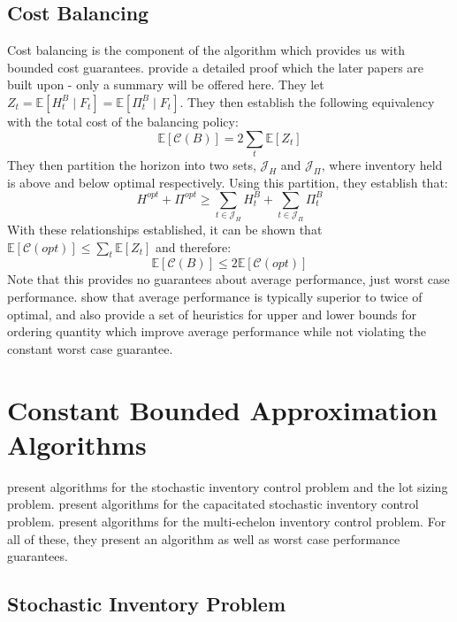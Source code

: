 \documentclass[12pt]{article}
\newcommand{\EX}{\mathbb{E}}
\begin{document}
\subsection{Cost Balancing}

Cost balancing is the component of the algorithm which provides us with bounded cost guarantees. \cite{levi:2007} provide a detailed proof which the later papers are built upon - only a summary will be offered here. They let $Z_t = \EX[H_t^B \; | \; F_t] = \EX[\Pi_t^B \; | \; F_t]$. They then establish the following equivalency with the total cost of the balancing policy:
$$
	\EX[\mathcal{C}(B)] = 2 \sum_t \EX[Z_t]
$$ 
They then partition the horizon into two sets, $\mathcal{J}_H$ and $\mathcal{J}_{\Pi}$, where inventory held is above and below optimal respectively. Using this partition, they establish that:
$$
	H^{opt} + \Pi^{opt} \geq \sum_{t \in \mathcal{J}_H} H_t^B + \sum_{t \in \mathcal{J}_{\Pi}} \Pi_t^B
$$
With these relationships established, it can be shown that $\EX[\mathcal{C}(opt)] \leq \sum_t \EX[Z_t]$ and therefore:
$$
	\EX[\mathcal{C}(B)] \leq 2 \EX[\mathcal{C}(opt)]
$$
Note that this provides no guarantees about average performance, just worst case performance. \cite{hurley:2007} show that average performance is typically superior to twice of optimal, and also provide a set of heuristics for upper and lower bounds for ordering quantity which improve average performance while not violating the constant worst case guarantee. 


\section{Constant Bounded Approximation Algorithms}

\cite{levi:2007} present algorithms for the stochastic inventory control problem and the lot sizing problem. \cite{levi:2008} present algorithms for the capacitated stochastic inventory control problem. \cite{levi:2016} present algorithms for the multi-echelon inventory control problem. For all of these, they present an algorithm as well as worst case performance guarantees. 

\subsection{Stochastic Inventory Problem}
\end{document}
